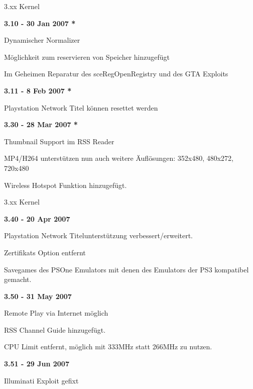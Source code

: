 \documentclass[mode=print,paper=screen,style=jefka]{powerdot}
\begin{document}
\begin{slide}{3.xx Kernel}
	\begin{large}\textbf{3.10 - 30 Jan 2007 *}\end{large}
	\begin{list}{-}{}
		\item{Dynamischer Normalizer}
		\item{Möglichkeit zum reservieren von Speicher hinzugefügt}
		\item{Im Geheimen Reparatur des sceRegOpenRegistry und des GTA Exploits}
	\end{list}
	\begin{large}\textbf{3.11 - 8 Feb 2007 *}\end{large}
	\begin{list}{-}{}
		\item{Playstation Network Titel können resettet werden}
	\end{list}
	\begin{large}\textbf{3.30 - 28 Mar 2007 *}\end{large}
	\begin{list}{-}{}
		\item{Thumbnail Support im RSS Reader}
		\item{MP4/H264 unterstützen nun auch weitere Äuflösungen: 352x480, 480x272, 720x480}
		\item{Wireless Hotspot Funktion hinzugefügt.}
	\end{list}
\end{slide}

\begin{slide}{3.xx Kernel}
	\begin{large}\textbf{3.40 - 20 Apr 2007}\end{large}
	\begin{list}{-}{}
		\item{Playstation Network Titelunterstützung verbessert/erweitert.}
		\item{Zertifikats Option entfernt}
		\item{Savegames des PSOne Emulators mit denen des Emulators der PS3 kompatibel gemacht.}
	\end{list}
	\begin{large}\textbf{3.50 - 31 May 2007}\end{large}
	\begin{list}{-}{}
		\item{Remote Play via Internet möglich}
		\item{RSS Channel Guide hinzugefügt.}
		\item{CPU Limit entfernt, möglich mit 333MHz statt 266MHz zu nutzen.}
	\end{list}
	\begin{large}\textbf{3.51 - 29 Jun 2007}\end{large}
	\begin{list}{-}{}
		\item{Illuminati Exploit gefixt}
	\end{list}
\end{slide}
\end{document}
